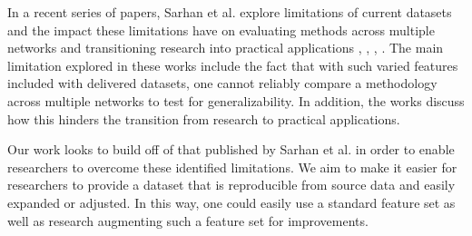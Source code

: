\documentclass[sigconf, anonymous, screen, review]{acmart}
\begin{document}
In a recent series of papers, Sarhan et al. explore limitations of current datasets and the impact these limitations have on evaluating methods across multiple networks and transitioning research into practical applications \cite{sarhan2020netflow}, \cite{sarhan2021cyber}, \cite{Sarhan2021}, \cite{sarhan_arxiv2021}.
The main limitation explored in these works include the fact that with such varied features included with delivered datasets, one cannot reliably compare a methodology across multiple networks to test for generalizability.
In addition, the works discuss how this hinders the transition from research to practical applications. 

Our work looks to build off of that published by Sarhan et al. in order to enable researchers to overcome these identified limitations.
We aim to make it easier for researchers to provide a dataset that is reproducible from source data and easily expanded or adjusted.
In this way, one could easily use a standard feature set as well as research augmenting such a feature set for improvements.
\end{document}
